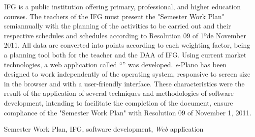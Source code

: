 IFG is a public institution offering primary, professional, and higher education courses.
The teachers of the IFG must present the "Semester Work Plan" semiannually with the planning of the activities to be carried out and their respective schedules and schedules according to Resolution 09 of 1ºde November 2011.
All data are converted into points according to each weighting factor, being a planning tool both for the teacher and the \acf{DAA} of \ac{IFG}.
Using current market technologies, a web application called ``'' was developed.
\textit{e}-Plano has been designed to work independently of the operating system, responsive to screen size in the browser and with a user-friendly interface.
These characteristics were the result of the application of several techniques and methodologies of software development, intending to facilitate the completion of the document, ensure compliance of the "Semester Work Plan" with Resolution 09 of November 1, 2011.

\begin{keywords}
Semester Work Plan, IFG, software development, \textit{Web} application
\end{keywords}